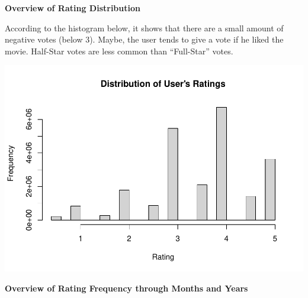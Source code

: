 \documentclass[
]{article}
\newenvironment{Shaded}{}{}
\newcommand{\AttributeTok}[1]{\textcolor[rgb]{0.49,0.56,0.16}{#1}}
\newcommand{\FunctionTok}[1]{\textcolor[rgb]{0.02,0.16,0.49}{#1}}
\newcommand{\NormalTok}[1]{#1}
\newcommand{\SpecialCharTok}[1]{\textcolor[rgb]{0.25,0.44,0.63}{#1}}
\newcommand{\StringTok}[1]{\textcolor[rgb]{0.25,0.44,0.63}{#1}}
\begin{document}
\textbf{Overview of Rating Distribution}

According to the histogram below, it shows that there are a small amount
of negative votes (below 3). Maybe, the user tends to give a vote if he
liked the movie. Half-Star votes are less common than ``Full-Star''
votes.

\begin{Shaded}
\end{Shaded}

\begin{center}\includegraphics{MovieLens-Project-Code_files/figure-latex/unnamed-chunk-20-1} \end{center}

\textbf{Overview of Rating Frequency through Months and Years}

\begin{Shaded}
\end{Shaded}
\end{document}
